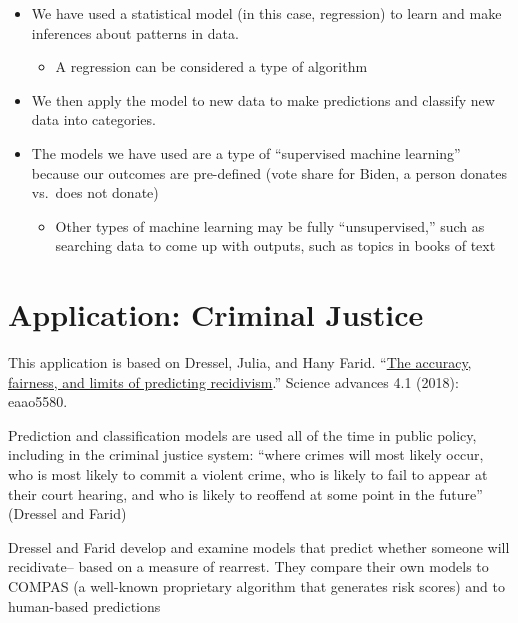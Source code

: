 \documentclass[
  letterpaper,
  DIV=11,
  numbers=noendperiod]{scrreprt}
\providecommand{\tightlist}{%
  \setlength{\itemsep}{0pt}\setlength{\parskip}{0pt}}\usepackage{longtable,booktabs,array}
\begin{document}
\begin{itemize}
\tightlist
\item
  We have used a statistical model (in this case, regression) to learn
  and make inferences about patterns in data.

  \begin{itemize}
  \tightlist
  \item
    A regression can be considered a type of algorithm
  \end{itemize}
\item
  We then apply the model to new data to make predictions and classify
  new data into categories.
\item
  The models we have used are a type of ``supervised machine learning''
  because our outcomes are pre-defined (vote share for Biden, a person
  donates vs.~does not donate)

  \begin{itemize}
  \tightlist
  \item
    Other types of machine learning may be fully ``unsupervised,'' such
    as searching data to come up with outputs, such as topics in books
    of text
  \end{itemize}
\end{itemize}

\hypertarget{application-criminal-justice}{%
\section{Application: Criminal
Justice}\label{application-criminal-justice}}

This application is based on Dressel, Julia, and Hany Farid.
``\href{https://www.science.org/doi/10.1126/sciadv.aao5580}{The
accuracy, fairness, and limits of predicting recidivism}.'' Science
advances 4.1 (2018): eaao5580.

Prediction and classification models are used all of the time in public
policy, including in the criminal justice system: ``where crimes will
most likely occur, who is most likely to commit a violent crime, who is
likely to fail to appear at their court hearing, and who is likely to
reoffend at some point in the future'' (Dressel and Farid)

Dressel and Farid develop and examine models that predict whether
someone will recidivate-- based on a measure of rearrest. They compare
their own models to COMPAS (a well-known proprietary algorithm that
generates risk scores) and to human-based predictions
\end{document}
